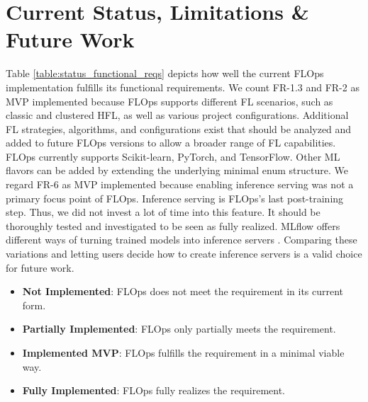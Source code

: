 \section{Current Status, Limitations \& Future Work}

Table \ref{table:status_functional_reqs} depicts how well the current FLOps implementation fulfills its functional requirements.
We count FR-1.3 and FR-2 as MVP implemented because FLOps supports different FL scenarios, such as classic and clustered HFL, as well as various project configurations.
Additional FL strategies, algorithms, and configurations exist that should be analyzed and added to future FLOps versions to allow a broader range of FL capabilities.
FLOps currently supports Scikit-learn, PyTorch, and TensorFlow.
Other ML flavors can be added by extending the underlying minimal enum structure.
We regard FR-6 as MVP implemented because enabling inference serving was not a primary focus point of FLOps.
Inference serving is FLOps's last post-training step.
Thus, we did not invest a lot of time into this feature.
It should be thoroughly tested and investigated to be seen as fully realized.
MLflow offers different ways of turning trained models into inference servers \cite{mlflow_inference_serving}.
Comparing these variations and letting users decide how to create inference servers is a valid choice for future work.

\begin{itemize}
    \item [\faCircleO] \textbf{Not Implemented}: FLOps does not meet the requirement in its current form. 
	\item [\faDotCircleO] \textbf{Partially Implemented}: FLOps only partially meets the requirement.
	\item [\faArrowCircleRight] \textbf{Implemented MVP}: FLOps fulfills the requirement in a minimal viable way.
	\item [\faCircle] \textbf{Fully Implemented}: FLOps fully realizes the requirement.
\end{itemize}

\begin{figure}[p]
	
		
\end{figure}

